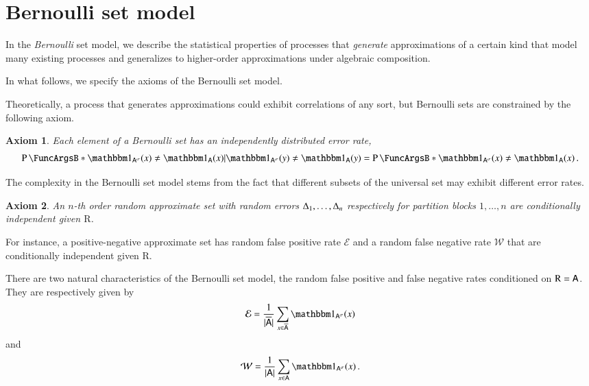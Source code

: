 \documentclass[10pt,final,hidelinks]{article}
\numberwithin{equation}{section}
\providecommand{\Given}{\vert}
\newcommand{\SetIndicator}[1]{\BlackboardSet{1}_{#1}}
\DeclarePairedDelimiter\Card{\lvert}{\rvert}
\newcommand{\FNR}{\mathcal{W}}
\newcommand{\FPR}{\mathcal{E}}
\newcommand{\RV}[1]{\mathrm{#1}}
\theoremstyle{plain}
\newtheorem{axiom}{Axiom}
\begin{document}
\section{Bernoulli set model}
In the \emph{Bernoulli} set model, we describe the statistical properties of processes that \emph{generate} approximations of a certain kind that model many existing processes and generalizes to higher-order approximations under algebraic composition.

In what follows, we specify the axioms of the Bernoulli set model.

Theoretically, a process that generates approximations could exhibit correlations of any sort, but Bernoulli sets are constrained by the following axiom.
\begin{axiom}
Each element of a Bernoulli set has an independently distributed error rate,
\begin{equation}
\Prob{\SetIndicator{\ASet{A}[\sigma]}(x) \neq \SetIndicator{\Set{A}}(x) \Given \SetIndicator{\ASet{A}[\sigma]}(y) \neq \SetIndicator{\Set{A}}(y)} =
	\Prob{\SetIndicator{\ASet{A}[\sigma]}(x) \neq \SetIndicator{\Set{A}}(x)}\,.
\end{equation}
\end{axiom}

The complexity in the Bernoulli set model stems from the fact that different subsets of the universal set may exhibit different error rates.
\begin{axiom}
\label{asm:fpr_fnr_r_indep}
An $n$-th order random approximate set with random errors $\Delta_1,\ldots,\Delta_n$ respectively for partition blocks $1,\ldots,n$ are conditionally independent given $\RV{R}$.
\end{axiom}
For instance, a positive-negative approximate set has random false positive rate $\FPR$ and a random false negative rate $\FNR$ that are conditionally independent given $\RV{R}$.


There are two natural characteristics of the Bernoulli set model, the random false positive and false negative rates conditioned on $\RV{R} = \Set{A}$.
They are respectively given by
\begin{equation}
	\FPR = \frac{1}{\Card{\SetComplement[\Set{A}]}} \sum_{x \in \SetComplement[\Set{A}]} \SetIndicator{\ASet{A}[\sigma]}(x)
\end{equation}
and
\begin{equation}
	\FNR = \frac{1}{\Card{\Set{A}}} \sum_{x \in \Set{A}} \SetIndicator{\ASet{A}[\sigma]}(x)\,.
\end{equation}
\end{document}
